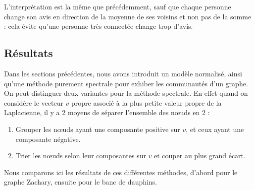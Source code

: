 \documentclass[12pt]{article}
\begin{document}
L'interprétation est la même que précédemment, sauf que chaque
personne change son avis en direction de la moyenne de ses voisins et
non pas de la somme : cela évite qu'une personne très connectée change
trop d'avis.
\subsection{Résultats}

Dans les sections précédentes, nous avons introduit un modèle normalisé, ainsi qu'une méthode purement spectrale pour exhiber les
communautés d'un graphe. On peut distinguer deux variantes pour la méthode spectrale. En effet quand on considère le vecteur $v$
propre associé à la plus petite valeur propre de la Laplacienne, il y a 2 moyens de séparer l'ensemble des n\oe uds en 2 :

\begin{enumerate}
	\item Grouper les n\oe uds ayant une composante positive sur $v$, et ceux ayant une composante négative.
	\item Trier les n\oe uds selon leur composantes sur $v$ et couper au plus grand écart.
\end{enumerate}

Nous comparons ici les résultats de ces différentes méthodes, d'abord pour le graphe Zachary, ensuite pour le banc de dauphins.
\end{document}

